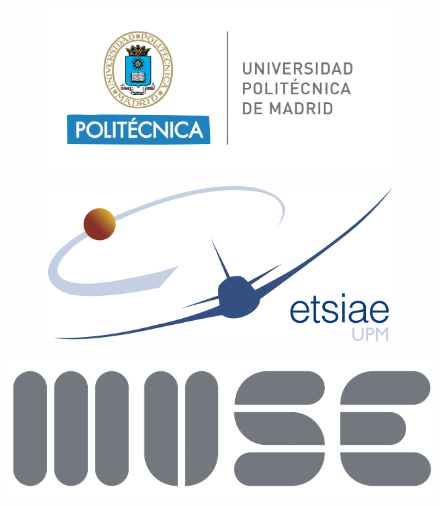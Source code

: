 \begin{center}
\thispagestyle{empty}


\begin{figure}
	\begin{subfigure}{0.5\textwidth}
		\includegraphics[width=\linewidth]{Images/Portada/Logo_UPM.png}\\
	\end{subfigure}
	\begin{subfigure}{0.5\textwidth}
		\includegraphics[width=\linewidth]{Images/Portada/Logo_ETSIAE.png}\\
	\end{subfigure}
\end{figure}

\begin{figure}
\centering
\includegraphics[width=0.75\linewidth]{Images/Portada/Logo_MUSE.png}
\end{figure}


\end{center}
